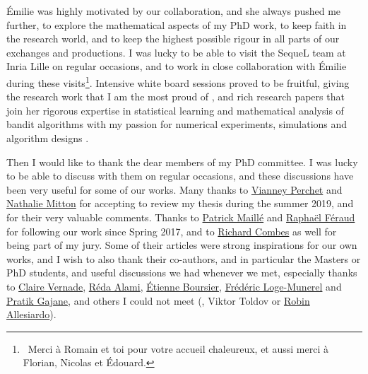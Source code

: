 \begin{acknowledgements}
Émilie was highly motivated by our collaboration, and she always pushed me further, to explore the mathematical aspects of my PhD work, to keep faith in the research world, and to keep the highest possible rigour in all parts of our exchanges and productions.
I was lucky to be able to visit the SequeL team at Inria Lille on regular occasions, and to work in close collaboration with Émilie during these visits\footnote{~Merci à Romain et toi pour votre accueil chaleureux, et aussi merci à Florian, Nicolas et Édouard.}. Intensive white board sessions proved to be fruitful, giving the research work that I am the most proud of \cite{Besson2018ALT}, and rich research papers that join her rigorous expertise in statistical learning and mathematical analysis of bandit algorithms with my passion for numerical experiments, simulations and algorithm designs \cite{Besson2018ALT,Besson2018DoublingTricks,Besson2019GLRT}.

Then I would like to thank the dear members of my PhD committee.
I was lucky to be able to discuss with them on regular occasions, and these discussions have been very useful for some of our works.
Many thanks to \href{https://sites.google.com/site/vianneyperchet/}{Vianney Perchet} and \href{http://researchers.lille.inria.fr/~mitton/}{Nathalie Mitton} for accepting to review my thesis during the summer 2019, and for their very valuable comments.
Thanks to \href{http://perso.telecom-bretagne.eu/patrickmaille/}{Patrick Maillé} and \href{https://www.researchgate.net/profile/Raphael_Feraud/}{Raphaël Féraud} for following our work since Spring 2017,
and to \href{http://rcombes.supelec.free.fr/}{Richard Combes} as well for being part of my jury.
Some of their articles were strong inspirations for our own works, and I wish to also thank their co-authors, and in particular the Masters or PhD students, and useful discussions we had whenever we met, especially thanks to \href{https://www.cvernade.com/}{Claire Vernade}, \href{https://www.linkedin.com/in/reda-alami-067304109}{Réda Alami}, \href{https://www.researchgate.net/profile/Etienne_Boursier}{Étienne Boursier}, \href{https://www.researchgate.net/profile/Frederic_Loge_Munerel}{Frédéric Loge-Munerel} and \href{https://pratikgajane.wordpress.com/}{Pratik Gajane}, and others I could not meet (\eg, Viktor Toldov or \href{https://fr.linkedin.com/in/robin-allesiardo-phd-39221a92}{Robin Allesiardo}).


\end{acknowledgements}
